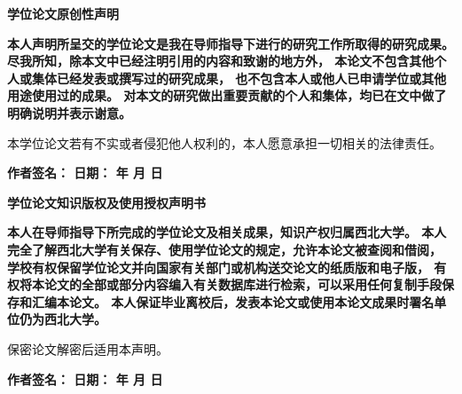 
{
    \vspace*{-2cm}
    \setlength{\parindent}{2em} %
    \vspace*{2cm}
    {
        {\centering \songti {} \bfseries 学位论文原创性声明\par}    %
        \vspace{21pt}
        \begin{spacing}{2.0}
        {\bfseries\songti {}本人声明所呈交的学位论文是我在导师指导下进行的研究工作所取得的研究成果。
        尽我所知，除本文中已经注明引用的内容和致谢的地方外，
        本论文不包含其他个人或集体已经发表或撰写过的研究成果，
        也不包含本人或他人已申请学位或其他用途使用过的成果。
        对本文的研究做出重要贡献的个人和集体，均已在文中做了明确说明并表示谢意。

        本学位论文若有不实或者侵犯他人权利的，本人愿意承担一切相关的法律责任。}
        \end{spacing}
        \vspace{10pt}
        \begin{center}
            {\bfseries\songti {}作者签名：\makebox[5em][c]{} \quad
            日期：
            \makebox[3em][c]{} 年
            \makebox[1.5em][c]{} 月
            \makebox[1.5em][c]{} 日}
        \end{center}
    }
    \vspace{2.5cm}
    {
        {\centering \songti {} \bfseries 学位论文知识版权及使用授权声明书\par}
        \vspace{21pt}
        \begin{spacing}{2.0}
        {\bfseries\songti {}本人在导师指导下所完成的学位论文及相关成果，知识产权归属西北大学。
        本人完全了解西北大学有关保存、使用学位论文的规定，允许本论文被查阅和借阅，
        学校有权保留学位论文并向国家有关部门或机构送交论文的纸质版和电子版，
        有权将本论文的全部或部分内容编入有关数据库进行检索，可以采用任何复制手段保存和汇编本论文。
        本人保证毕业离校后，发表本论文或使用本论文成果时署名单位仍为西北大学。

        保密论文解密后适用本声明。}
        \end{spacing}
        \vspace{10pt}
        \begin{center}
            {\bfseries\songti {}作者签名：\makebox[5em][c]{} \quad
            日期：
            \makebox[3em][c]{} 年
            \makebox[1.5em][c]{} 月
            \makebox[1.5em][c]{} 日}
        \end{center}
    }
}